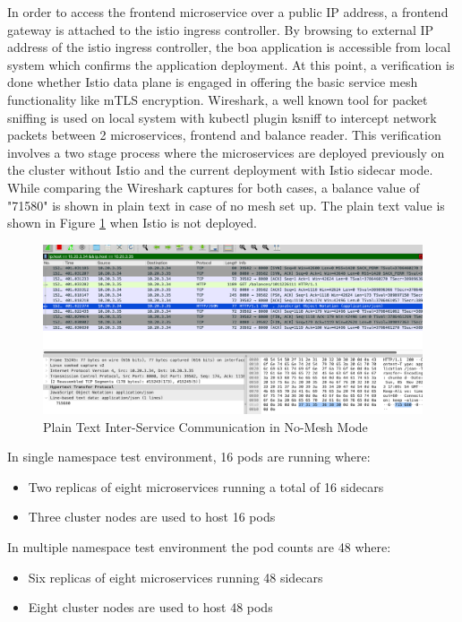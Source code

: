 In order to access the frontend microservice over a public IP address, a frontend gateway is attached to the istio ingress controller. By browsing to external IP address of the istio ingress controller, the \acrshort{boa} application is accessible from local system which confirms the application deployment. At this point, a verification is done whether Istio data plane is engaged in offering the basic service mesh functionality like mTLS encryption. Wireshark, a well known tool for packet sniffing is used on local system with kubectl plugin ksniff to intercept network packets between 2 microservices, frontend and balance reader. This verification involves a two stage process where the microservices are deployed previously on the cluster without Istio and the current deployment with Istio sidecar mode. While comparing the Wireshark captures for both cases, a balance value of "71580" is shown in plain text in case of no mesh set up. The plain text value is shown in Figure \ref{method:plainTxtWiresharkView} when Istio is not deployed.

\begin{figure}[ht!]
  \centering
  \includegraphics[width=1.0\linewidth]{resources/raw-balance-value.png}
  \caption{Plain Text Inter-Service Communication in No-Mesh Mode}
  \label{method:plainTxtWiresharkView}
\end{figure}

In single namespace test environment, 16 pods are running where:
\begin{itemize}
  \item Two replicas of eight microservices running a total of 16 sidecars
  \item Three cluster nodes are used to host 16 pods
\end{itemize}

In multiple namespace test environment the pod counts are 48 where:
\begin{itemize}
  \item Six replicas of eight microservices running 48 sidecars
  \item Eight cluster nodes are used to host 48 pods
\end{itemize}


